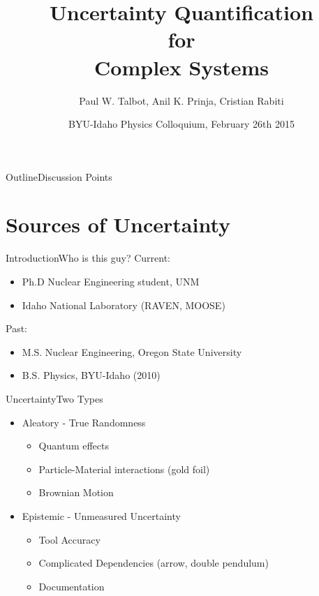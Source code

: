 \documentclass{beamer}
\title[Numerical UQ Methods] %
{Uncertainty Quantification\\ for\\ Complex Systems}
\author[Talbot] %
{Paul W. Talbot\inst{1}, Anil K. Prinja\inst{1}, Cristian Rabiti\inst{2}}
\institute[University of New Mexico] %
{
  \inst{1}%
  University of New Mexico\\
  \inst{2}
  Idaho National Laboratory
}
\date[BYU-I, 2014] %
{BYU-Idaho Physics Colloquium, February 26th 2015}
\begin{document}
\begin{frame}
  \titlepage
\end{frame}

\begin{frame}{Outline}{Discussion Points}\vspace{-20pt}
  \tableofcontents%
\end{frame}

\section{Sources of Uncertainty}
\begin{frame}{Introduction}{Who is this guy?}\vspace{-30pt}
Current: 
\begin{itemize}
\item  Ph.D Nuclear Engineering student, UNM
\item  Idaho National Laboratory (RAVEN, MOOSE)
\end{itemize}
Past: 
\begin{itemize}
\item M.S. Nuclear Engineering, Oregon State University
\item B.S. Physics, BYU-Idaho (2010)
\end{itemize}
\end{frame}

\begin{frame}{Uncertainty}{Two Types}\vspace{-30pt}
\begin{itemize}
\item Aleatory - True Randomness
\begin{itemize}
  \item Quantum effects
  \item Particle-Material interactions (gold foil)
  \item Brownian Motion
\end{itemize}\vspace{20pt}
\item Epistemic - Unmeasured Uncertainty
  \begin{itemize}
  \item Tool Accuracy
  \item Complicated Dependencies (arrow, double pendulum)
  \item Documentation
  \end{itemize}
\end{itemize}
\end{frame}
\end{document}
